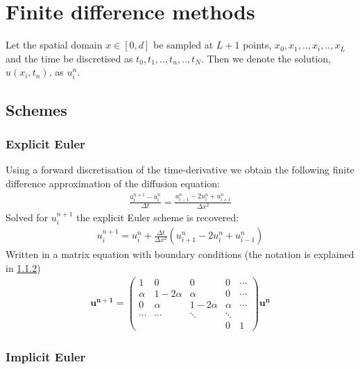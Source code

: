 \documentclass[11pt,a4paper,draft]{article}
\numberwithin{equation}{section}
\begin{document}
\section{Finite difference methods}

Let the spatial domain $x \in [0,d]$ be sampled at $L+1$ points, $x_0,x_1,..,x_i,..,x_L$ and the time be discretised as $t_0,t_1,..,t_n,..,t_N$. Then we denote the solution, $u(x_i,t_n)$, as $u_i^n$.  

\subsection{Schemes}

\subsubsection{Explicit Euler}
Using a forward discretisation of the time-derivative we obtain the following finite difference approximation of the diffusion equation:
\begin{align}
\frac{u_{i}^{n+1}-u_{i}^{n}}{\Delta t} = \frac{u_{i-1}^{n}-2u_{i}^{n}+u_{i+1}^{n}}{\Delta x^2}
\end{align}
Solved for $u_{i}^{n+1}$ the explicit Euler scheme is recovered:
\begin{gather}
u_i^{n+1} = u_i^n + \frac{\Delta t}{\Delta x^2}\left(
u_{i+1}^n - 2u_i^n + u_{i-1}^n
\right)
\end{gather}
Written in a matrix equation with boundary conditions (the notation 
is explained in \ref{subsubsec:implicit_euler})
\begin{gather}
\mathbf{u^{n+1}} = 
\begin{pmatrix}
1 & 0 & 0 & 0 & \cdots\\
\alpha & 1 - 2\alpha & \alpha & 0 & \cdots\\
0 & \alpha & 1-2\alpha & \alpha & \cdots\\
\cdots & \cdots & \ddots & \ddots& \\
&&& 0 & 1
\end{pmatrix} \mathbf{u^n}
\end{gather}


\subsubsection{Implicit Euler}
\label{subsubsec:implicit_euler}
\end{document}

